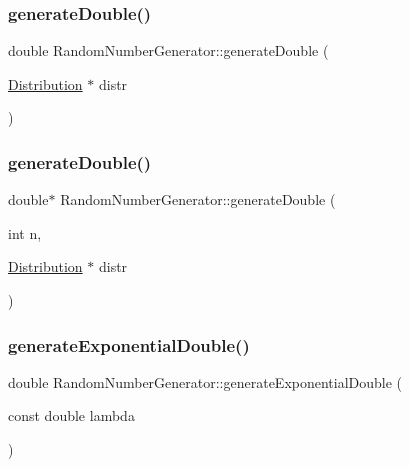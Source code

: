 \subsubsection{\texorpdfstring{generate\+Double()}{generateDouble()}\hspace{0.1cm}{\footnotesize\ttfamily [1/2]}}
{\footnotesize\ttfamily double Random\+Number\+Generator\+::generate\+Double (\begin{DoxyParamCaption}\item[{\hyperlink{class_distribution}{Distribution} $\ast$}]{distr }\end{DoxyParamCaption})}

\mbox{\label{class_random_number_generator_abccfd1a04f5a1f802f4b3479b5fbc1e8}} 
\subsubsection{\texorpdfstring{generate\+Double()}{generateDouble()}\hspace{0.1cm}{\footnotesize\ttfamily [2/2]}}
{\footnotesize\ttfamily double$\ast$ Random\+Number\+Generator\+::generate\+Double (\begin{DoxyParamCaption}\item[{int}]{n,  }\item[{\hyperlink{class_distribution}{Distribution} $\ast$}]{distr }\end{DoxyParamCaption})}

\mbox{\label{class_random_number_generator_a95d897f9265ece8d5ee18fbf2802b844}} 
\subsubsection{\texorpdfstring{generate\+Exponential\+Double()}{generateExponentialDouble()}\hspace{0.1cm}{\footnotesize\ttfamily [1/2]}}
{\footnotesize\ttfamily double Random\+Number\+Generator\+::generate\+Exponential\+Double (\begin{DoxyParamCaption}\item[{const double}]{lambda }\end{DoxyParamCaption})}


